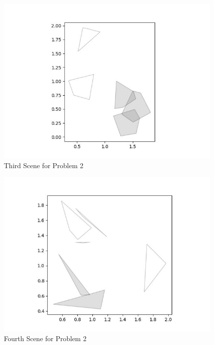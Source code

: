 \documentclass{article}
\begin{document}
\begin{figure}[h!]
	\includegraphics[width= 0.9 \linewidth]{Problem2_scene3.jpg}
	\centering
	\caption{Third Scene for Problem 2}
	\label{Problem2_scene3.jpg}
\end{figure}

\begin{figure}[h!]
	\includegraphics[width= 0.9 \linewidth]{Problem2_scene4.jpg}
	\centering
	\caption{Fourth Scene for Problem 2}
	\label{Problem2_scene4.jpg}
\end{figure}
\end{document}
